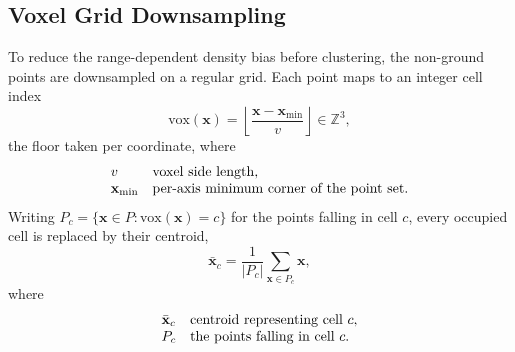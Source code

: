 \subsection{Voxel Grid Downsampling}
\label{sec:th-voxel}
To reduce the range-dependent density bias before clustering, the non-ground points are
downsampled on a regular grid. Each point maps to an integer cell index
\begin{equation}
  \mathrm{vox}(\mathbf{x}) = \left\lfloor \frac{\mathbf{x} - \mathbf{x}_{\min}}{v} \right\rfloor \in \mathbb{Z}^3 ,
  \label{eq:voxel-index}
\end{equation}
the floor taken per coordinate, where
\[
  \begin{array}{@{}l@{\quad}l@{}}
    v & \text{voxel side length,}\\
    \mathbf{x}_{\min} & \text{per-axis minimum corner of the point set.}
  \end{array}
\]
Writing $P_c = \{\mathbf{x}\in P : \mathrm{vox}(\mathbf{x}) = c\}$ for the points falling in
cell $c$, every occupied cell is replaced by their centroid,
\begin{equation}
  \bar{\mathbf{x}}_c = \frac{1}{\lvert P_c\rvert} \sum_{\mathbf{x}\in P_c} \mathbf{x} ,
  \label{eq:voxel-centroid}
\end{equation}
where
\[
  \begin{array}{@{}l@{\quad}l@{}}
    \bar{\mathbf{x}}_c & \text{centroid representing cell } c,\\
    P_c & \text{the points falling in cell } c.
  \end{array}
\]

